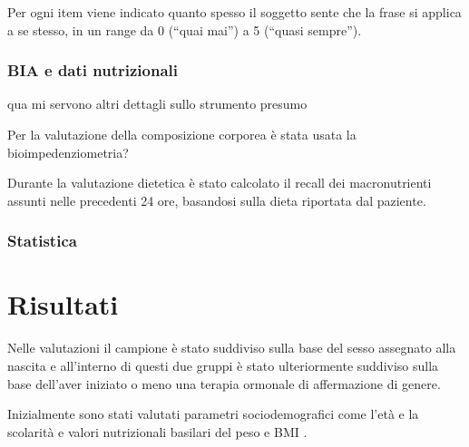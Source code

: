 \documentclass[12pt]{article}
\begin{document}
Per ogni item viene indicato quanto spesso il soggetto sente che la frase si applica a se stesso, in un range da 0 (``quai mai'') a 5 (``quasi sempre'').
\subsubsection{BIA e dati nutrizionali}
\label{sec:orgcc8cb73}
qua mi servono altri dettagli sullo strumento presumo

Per la valutazione della composizione corporea è stata usata la bioimpedenziometria?

Durante la valutazione dietetica è stato calcolato il recall dei macronutrienti assunti nelle precedenti 24 ore, basandosi sulla dieta riportata dal paziente.
\subsubsection{Statistica}
\label{sec:orgdc7619d}
\section{Risultati}
\label{sec:org44c448f}

Nelle valutazioni il campione è stato suddiviso sulla base del sesso assegnato alla nascita e all'interno di questi due gruppi è stato ulteriormente suddiviso sulla base dell'aver iniziato o meno una terapia ormonale di affermazione di genere.

Inizialmente sono stati valutati parametri sociodemografici come l'età e la scolarità e valori nutrizionali basilari del peso e BMI .
\end{document}
